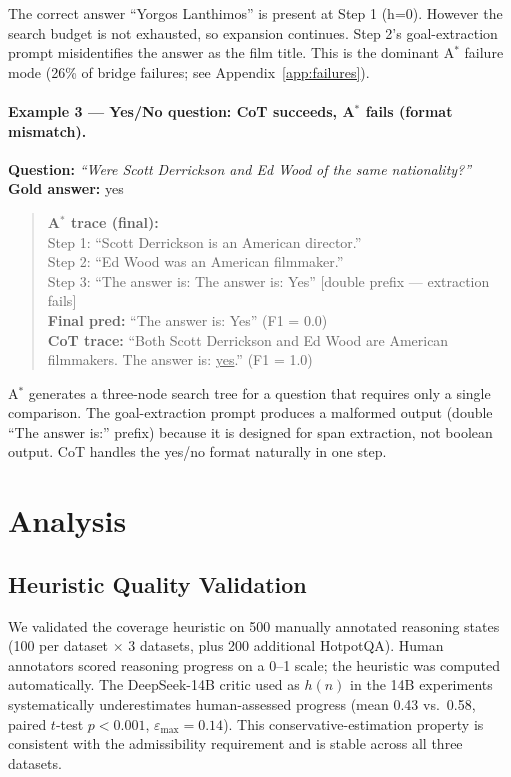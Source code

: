 \documentclass{article}
\newcommand{\astar}{A$^*$\xspace}
\begin{document}
The correct answer ``Yorgos Lanthimos'' is present at Step 1 (h=0). However the search budget is not exhausted, so expansion continues. Step 2's goal-extraction prompt misidentifies the answer as the film title. This is the dominant \astar failure mode (26\% of bridge failures; see Appendix~\ref{app:failures}).

\paragraph{Example 3 --- Yes/No question: CoT succeeds, \astar fails (format mismatch).}
\textbf{Question:} \textit{``Were Scott Derrickson and Ed Wood of the same nationality?''}\\
\textbf{Gold answer:} yes

\begin{quote}
\textbf{\astar trace (final):}\\
Step 1: ``Scott Derrickson is an American director.''\\
Step 2: ``Ed Wood was an American filmmaker.''\\
Step 3: ``The answer is: The answer is: Yes'' [double prefix --- extraction fails]\\
\textbf{Final pred:} ``The answer is: Yes'' (F1 = 0.0)\\[4pt]
\textbf{CoT trace:} ``Both Scott Derrickson and Ed Wood are American filmmakers. The answer is: \underline{yes}.'' (F1 = 1.0)
\end{quote}

\astar generates a three-node search tree for a question that requires only a single comparison. The goal-extraction prompt produces a malformed output (double ``The answer is:'' prefix) because it is designed for span extraction, not boolean output. CoT handles the yes/no format naturally in one step.

\section{Analysis}
\label{sec:analysis}

\subsection{Heuristic Quality Validation}
\label{sec:heuristic_val}

We validated the coverage heuristic on 500 manually annotated reasoning states (100 per dataset $\times$ 3 datasets, plus 200 additional HotpotQA). Human annotators scored reasoning progress on a 0--1 scale; the heuristic was computed automatically. The DeepSeek-14B critic used as $h(n)$ in the 14B experiments systematically underestimates human-assessed progress (mean 0.43 vs.\ 0.58, paired $t$-test $p < 0.001$, $\varepsilon_{\max} = 0.14$). This conservative-estimation property is consistent with the admissibility requirement and is stable across all three datasets.
\end{document}
